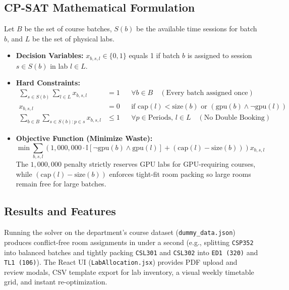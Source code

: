 \documentclass[12pt,a4paper]{article}
\begin{document}
\subsection{CP-SAT Mathematical Formulation}
Let $B$ be the set of course batches, $S(b)$ be the available time sessions for batch $b$, and $L$ be the set of physical labs.
\begin{itemize}[leftmargin=*]
    \item \textbf{Decision Variables:} $x_{b,s,l} \in \{0, 1\}$ equals 1 if batch $b$ is assigned to session $s \in S(b)$ in lab $l \in L$.
    \item \textbf{Hard Constraints:}
    \begin{align*}
        \sum_{s \in S(b)} \sum_{l \in L} x_{b,s,l} &= 1 && \forall b \in B \quad (\text{Every batch assigned once}) \\
        x_{b,s,l} &= 0 && \text{if } \text{cap}(l) < \text{size}(b) \text{ or } (\text{gpu}(b) \land \neg \text{gpu}(l)) \\
        \sum_{b \in B} \sum_{s \in S(b) : p \in s} x_{b,s,l} &\le 1 && \forall p \in \text{Periods},\, l \in L \quad (\text{No Double Booking})
    \end{align*}
    \item \textbf{Objective Function (Minimize Waste):}
    \begin{equation*}
        \min \sum_{b, s, l} \left( 1{,}000{,}000 \cdot \mathbb{I}[\neg \text{gpu}(b) \land \text{gpu}(l)] + (\text{cap}(l) - \text{size}(b)) \right) x_{b,s,l}
    \end{equation*}
    The $1{,}000{,}000$ penalty strictly reserves GPU labs for GPU-requiring courses, while $(\text{cap}(l) - \text{size}(b))$ enforces tight-fit room packing so large rooms remain free for large batches.
\end{itemize}

\subsection{Results and Features}
Running the solver on the department's course dataset (\texttt{dummy\_data.json}) produces conflict-free room assignments in under a second (e.g., splitting \texttt{CSP352} into balanced batches and tightly packing \texttt{CSL301} and \texttt{CSL302} into \texttt{ED1 (320)} and \texttt{TL1 (106)}). The React UI (\texttt{LabAllocation.jsx}) provides PDF upload and review modals, CSV template export for lab inventory, a visual weekly timetable grid, and instant re-optimization.
\end{document}
